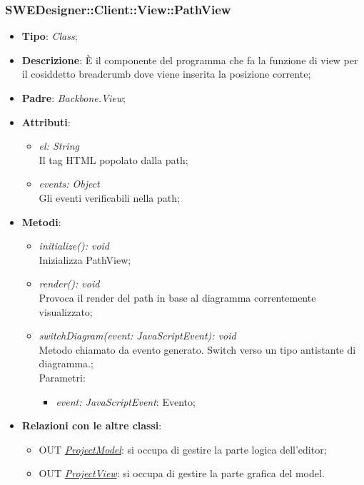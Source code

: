 \documentclass[../DefinizioneDiProdotto.tex]{subfiles}
\begin{document}
				\subsubsection{SWEDesigner::Client::View::PathView}
					\hypertarget{SWEDesigner::Client::View::PathView}{}
					\begin{itemize}
						\item \textbf{Tipo}: \emph{Class};
						\item \textbf{Descrizione}: È il componente del programma che fa la funzione di view per il cosiddetto breadcrumb dove viene inserita la posizione corrente;
						\item \textbf{Padre}: \emph{Backbone.View};
						\item \textbf{Attributi}:
						\begin{itemize}
							\item \emph{el: String} \\
							Il tag HTML popolato dalla path;
							\item \emph{events: Object} \\
							Gli eventi verificabili nella path;
						\end{itemize}
						\item \textbf{Metodi}:
						\begin{itemize}
							\item \emph{initialize(): void} \\
							Inizializza PathView; 
							\item \emph{render(): void} \\
							Provoca il render del path in base al diagramma correntemente visualizzato; 
							\item \emph{switchDiagram(event: JavaScriptEvent): void} \\
							Metodo chiamato da evento generato. Switch verso un tipo antistante di diagramma.; \\
							Parametri:
							\begin{itemize}
								\item \emph{event: JavaScriptEvent}: Evento;
							\end{itemize}
						\end{itemize}
						\item \textbf{Relazioni con le altre classi}:
						\begin{itemize}
							\item OUT \hyperlink{SWEDesigner::Model::ProjectModel}{\emph{ProjectModel}}: si occupa di gestire la parte logica dell'editor;
							\item OUT \hyperlink{SWEDesigner::View::ProjectView}{\emph{ProjectView}}: si occupa di gestire la parte grafica del model.
						\end{itemize}
					\end{itemize}
\end{document}
